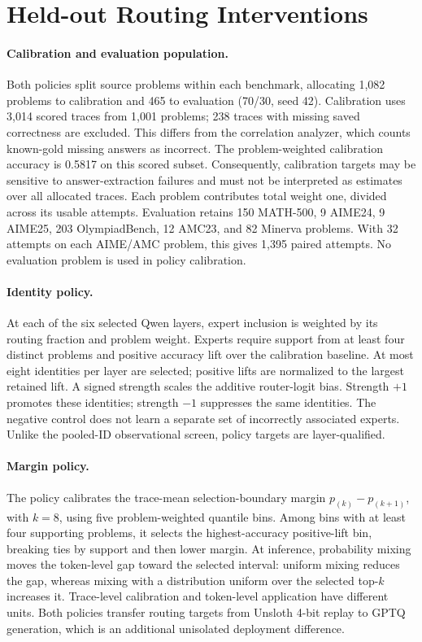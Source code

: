 \section{Held-out Routing Interventions}
\label{sec:guiding}

\paragraph{Calibration and evaluation population.}
Both policies split source problems within each benchmark, allocating 1,082
problems to calibration and 465 to evaluation (70/30, seed 42).
Calibration uses 3,014 scored traces from 1,001 problems; 238 traces with
missing saved correctness are excluded. This differs from the correlation
analyzer, which counts known-gold missing answers as incorrect. The
problem-weighted calibration accuracy is 0.5817 on this scored subset.
Consequently, calibration targets may be sensitive to answer-extraction
failures and must not be interpreted as estimates over all allocated traces.
Each problem contributes total weight one, divided across its usable attempts.
Evaluation retains 150 MATH-500, 9 AIME24, 9 AIME25, 203 OlympiadBench,
12 AMC23, and 82 Minerva problems. With 32 attempts on each AIME/AMC
problem, this gives 1,395 paired attempts. No evaluation problem is used
in policy calibration.

\paragraph{Identity policy.}
At each of the six selected Qwen layers, expert inclusion is weighted by
its routing fraction and problem weight. Experts require support from at
least four distinct problems and positive accuracy lift over the calibration
baseline. At most eight identities per layer are selected; positive lifts
are normalized to the largest retained lift. A signed strength scales the
additive router-logit bias. Strength $+1$ promotes these identities;
strength $-1$ suppresses the same identities. The negative control does
not learn a separate set of incorrectly associated experts. Unlike the
pooled-ID observational screen, policy targets are layer-qualified.

\paragraph{Margin policy.}
The policy calibrates the trace-mean selection-boundary margin
$p_{(k)}-p_{(k+1)}$, with $k=8$, using five problem-weighted quantile bins.
Among bins with at least four supporting problems, it selects the
highest-accuracy positive-lift bin, breaking ties by support and then lower
margin. At inference, probability mixing moves the token-level gap toward
the selected interval: uniform mixing reduces the gap, whereas mixing with
a distribution uniform over the selected top-$k$ increases it.
Trace-level calibration and token-level application have different units.
Both policies transfer routing targets from Unsloth 4-bit replay to GPTQ
generation, which is an additional unisolated deployment difference.

